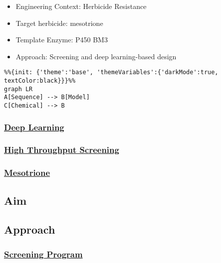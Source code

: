 \begin{itemize}
\tightlist
\item
  Engineering Context: Herbicide Resistance
\item
  Target herbicide: mesotrione
\item
  Template Enzyme: P450 BM3
\item
  Approach: Screening and deep learning-based design
\end{itemize}

\begin{verbatim}
%%{init: {'theme':'base', 'themeVariables':{'darkMode':true, textColor:black}}}%%
graph LR
A[Sequence] --> B[Model]
C[Chemical] --> B
\end{verbatim}

\hypertarget{deep-learning}{%
\subsubsection{\texorpdfstring{\href{deep-learning.md}{Deep
Learning}}{Deep Learning}}\label{deep-learning}}

\hypertarget{high-throughput-screening-1}{%
\subsubsection{\texorpdfstring{\href{hts.md}{High Throughput
Screening}}{High Throughput Screening}}\label{high-throughput-screening-1}}

\hypertarget{mesotrione-1}{%
\subsubsection{\texorpdfstring{\href{mesotrione.md}{Mesotrione}}{Mesotrione}}\label{mesotrione-1}}

\hypertarget{aim-2}{%
\subsection{Aim}\label{aim-2}}

\hypertarget{approach-1}{%
\subsection{Approach}\label{approach-1}}

\hypertarget{screening-program}{%
\subsubsection{\texorpdfstring{\href{screening-fist.md}{Screening
Program}}{Screening Program}}\label{screening-program}}

